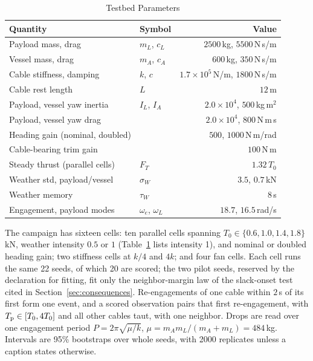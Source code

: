 \begin{table}[t]
  \caption{Testbed Parameters}
  \label{tab:plant}
  \centering
  \setlength{\tabcolsep}{3.4pt}
  \renewcommand{\arraystretch}{0.96}
  \begin{tabular}{llr}
    \toprule
    Quantity & Symbol & Value \\
    \midrule
    Payload mass, drag & $m_L$, $c_L$ & $2500$\,kg, $5500$\,N\,s/m \\
    Vessel mass, drag & $m_A$, $c_A$ & $600$\,kg, $350$\,N\,s/m \\
    Cable stiffness, damping & $k$, $c$ & $1.7\!\times\!10^{5}$\,N/m, $1800$\,N\,s/m \\
    Cable rest length & $L$ & $12$\,m \\
    Payload, vessel yaw inertia & $I_L$, $I_A$ & $2.0\!\times\!10^{4}$, $500$\,kg\,m$^2$ \\
    Payload, vessel yaw drag & & $2.0\!\times\!10^{4}$, $800$\,N\,m\,s \\
    Heading gain (nominal, doubled) & & $500$, $1000$\,N\,m/rad \\
    Cable-bearing trim gain & & $100$\,N\,m \\
    Steady thrust (parallel cells) & $F_T$ & $1.32\,T_0$ \\
    Weather std, payload/vessel & $\sigma_W$ & $3.5$, $0.7$\,kN \\
    Weather memory & $\tau_W$ & $8$\,s \\
    Engagement, payload modes & $\omega_e$, $\omega_L$ & $18.7$, $16.5$\,rad/s \\
    \bottomrule
  \end{tabular}
\end{table}

The campaign has sixteen cells: ten parallel cells spanning $T_0\in\{0.6,1.0,1.4,1.8\}$\,kN, weather intensity $0.5$ or $1$ (Table~\ref{tab:plant} lists intensity 1), and nominal or doubled heading gain; two stiffness cells at $k/4$ and $4k$; and four fan cells. Each cell runs the same 22 seeds, of which 20 are scored; the two pilot seeds, reserved by the declaration for fitting, fit only the neighbor-margin law of the slack-onset test cited in Section~\ref{sec:consequences}. Re-engagements of one cable within $2$\,s of its first form one event, and a scored observation pairs that first re-engagement, with $T_{\mathrm{p}}\in[T_0,4T_0]$ and all other cables taut, with one neighbor. Drops are read over one engagement period $P=2\pi\sqrt{\mu/k}$, $\mu=m_Am_L/(m_A+m_L)=484$\,kg. Intervals are 95\% bootstraps over whole seeds, with 2000 replicates unless a caption states otherwise.

